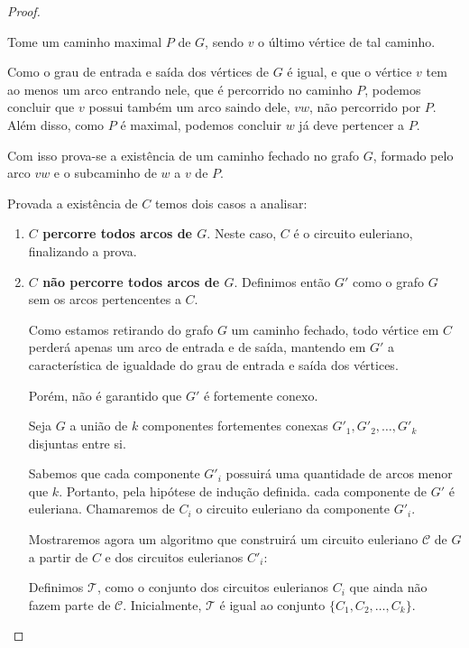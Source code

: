 \begin{proof}
\begin{tcolorbox}
        Tome um caminho maximal $P$ de $G$, sendo $v$ o último vértice de tal caminho.

        Como o grau de entrada e saída dos vértices de $G$ é igual, e que o vértice $v$ tem ao menos um arco entrando nele, que é percorrido no caminho $P$, podemos concluir que $v$ possui também um arco saindo dele, $vw$, não percorrido por $P$.
        Além disso, como $P$ é maximal, podemos concluir $w$ já deve pertencer a $P$.

        Com isso prova-se a existência de um caminho fechado no grafo $G$, formado pelo arco $vw$ e o subcaminho de $w$ a $v$ de $P$.
    \end{tcolorbox}

    Provada a existência de $C$ temos dois casos a analisar:

    \begin{enumerate}
        \item \textbf{$C$ percorre todos arcos de $G$}.
            Neste caso, $C$ é o circuito euleriano, finalizando a prova.

        \item \textbf{$C$ não percorre todos arcos de $G$}.
            Definimos então $G'$ como o grafo $G$ sem os arcos pertencentes a $C$.

            Como estamos retirando do grafo $G$ um caminho fechado, todo vértice em $C$ perderá apenas um arco de entrada e de saída, mantendo em $G'$ a característica de igualdade do grau de entrada e saída dos vértices.

            Porém, não é garantido que $G'$ é fortemente conexo. 

            Seja $G$ a união de $k$ componentes fortementes conexas $G'_1, G'_2, \dots, G'_k$ disjuntas entre si.

            Sabemos que cada componente $G'_i$ possuirá uma quantidade de arcos menor que $k$. 
            Portanto, pela hipótese de indução definida. cada componente de $G'$ é euleriana.
            Chamaremos de $C_i$ o circuito euleriano da componente $G'_i$.

            Mostraremos agora um algoritmo que construirá um circuito euleriano $\mathcal{C}$ de $G$ a partir de $C$ e dos circuitos eulerianos $C'_i$:


            Definimos $\mathcal{T}$, como o conjunto dos circuitos eulerianos $C_i$ que ainda não fazem parte de $\mathcal{C}$. 
            Inicialmente, $\mathcal{T}$ é igual ao conjunto $\{C_1, C_2, \dots, C_k\}$.



\end{enumerate}
\end{proof}
